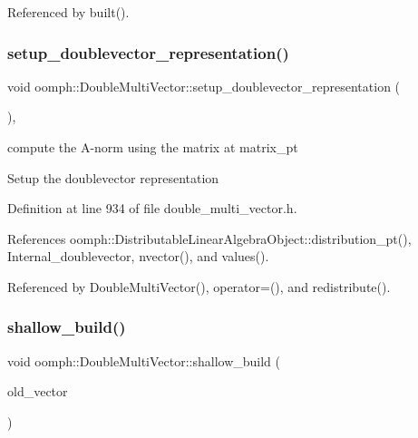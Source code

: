 Referenced by built().

\mbox{\label{classoomph_1_1DoubleMultiVector_a09b97b4d4c7d0945178e8bf190813cdd}} 
\subsubsection{\texorpdfstring{setup\+\_\+doublevector\+\_\+representation()}{setup\_doublevector\_representation()}}
{\footnotesize\ttfamily void oomph\+::\+Double\+Multi\+Vector\+::setup\+\_\+doublevector\+\_\+representation (\begin{DoxyParamCaption}{ }\end{DoxyParamCaption})\hspace{0.3cm}{\ttfamily [inline]}, {\ttfamily [private]}}



compute the A-\/norm using the matrix at matrix\+\_\+pt 

Setup the doublevector representation 

Definition at line 934 of file double\+\_\+multi\+\_\+vector.\+h.



References oomph\+::\+Distributable\+Linear\+Algebra\+Object\+::distribution\+\_\+pt(), Internal\+\_\+doublevector, nvector(), and values().



Referenced by Double\+Multi\+Vector(), operator=(), and redistribute().

\mbox{\label{classoomph_1_1DoubleMultiVector_a9a414941fb00967f670a1700bc87af7e}} 
\subsubsection{\texorpdfstring{shallow\+\_\+build()}{shallow\_build()}\hspace{0.1cm}{\footnotesize\ttfamily [1/3]}}
{\footnotesize\ttfamily void oomph\+::\+Double\+Multi\+Vector\+::shallow\+\_\+build (\begin{DoxyParamCaption}\item[{const \hyperlink{classoomph_1_1DoubleMultiVector}{Double\+Multi\+Vector} \&}]{old\+\_\+vector }\end{DoxyParamCaption})\hspace{0.3cm}{\ttfamily [inline]}}



